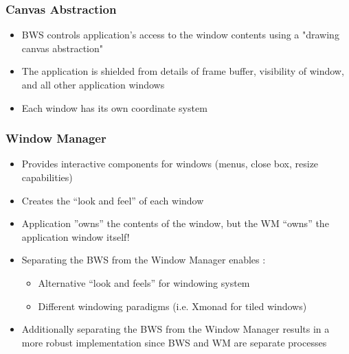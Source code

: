 \documentclass[twoside]{article}
\begin{document}
\subsubsection{Canvas Abstraction }
\begin{itemize}
\item BWS controls application's access to the window contents using a "drawing canvas abstraction"  
\item The application is shielded from details of frame buffer, visibility of window, and all other application windows
\item Each window has its own coordinate system
\end{itemize}

\subsubsection{Window Manager}
\begin{itemize}
\item Provides interactive components for windows (menus, close box, resize capabilities)
\item Creates the “look and feel” of each window
\item Application ”owns” the contents of the window, but the WM “owns” the application window itself!
\item Separating the BWS from the Window Manager enables : 
\begin{itemize}
\item Alternative “look and feels” for windowing system
\item Different windowing paradigms (i.e. Xmonad for tiled windows)
\end{itemize}
\item Additionally separating the BWS from the Window Manager results in a more robust implementation since BWS and WM are separate processes
\end{itemize}
\end{document}
